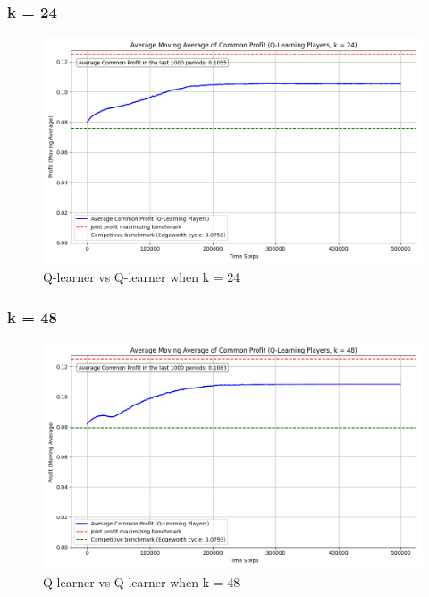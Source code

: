\documentclass{article}
\begin{document}
\subsubsection{k = 24}
\begin{figure}[H]
    \centering
    \includegraphics[scale = 0.45]{K=24.png}
    \caption{Q-learner vs Q-learner when k = 24}
    \label{fig: QlearnervQlearnerK=24}
\end{figure}

\subsubsection{k = 48}
\begin{figure}[H]
    \centering
    \includegraphics[scale = 0.45]{K=48.png}
    \caption{Q-learner vs Q-learner when k = 48}
    \label{fig: QlearnervQlearnerK=48}
\end{figure}
\end{document}
